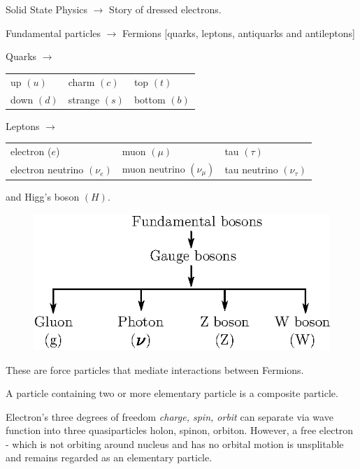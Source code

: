 \chapter[Lecture 1]{}\label{lec1}

Solid State Physics $\to$ Story of dressed electrons.

Fundamental particles $\to$ Fermions [quarks, leptons, antiquarks and antileptons]

\smallskip
Quarks $\to$
\begin{center}
\begin{tabular}{lll}
up $(u)$ & charm $(c)$ & top $(t)$\\[3pt]
down $(d)$ & strange $(s)$ & bottom $(b)$ 
\end{tabular}
\end{center}

Leptons $\to$
\begin{center}
\begin{tabular}{lll}
electron ($e$) & muon $(\mu)$ & tau $(\tau)$\\[3pt]
electron neutrino $(\nu_{e})$ & muon neutrino $(\nu_{\mu})$ & tau neutrino $(\nu_{\tau})$
\end{tabular}
\end{center}
and Higg's boson $(H)$.
\begin{figure}[H]
\centering
\includegraphics[scale=1.1]{images/lecture1/fig1.eps}
\end{figure}

These are force particles that mediate interactions between Fermions.

A particle containing two or more elementary particle is a composite particle.

Electron's three degrees of freedom {\em charge, spin, orbit} can separate via wave function into three quasiparticles holon, spinon, orbiton. However, a free electron - which is not orbiting around nucleus and has no orbital motion is unsplitable and remains regarded as an elementary particle.

